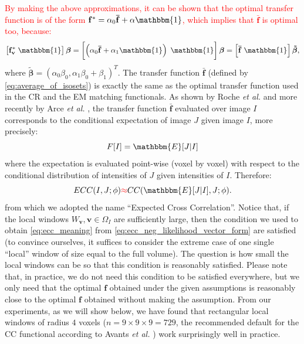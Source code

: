 \textcolor{red}{By making the above approximations, it can be shown that the optimal transfer function is of the form $\mathbf{f^{*}} = \alpha_{0} \mathbf{\bar{f}} + \alpha\mathbbm{1}$, which implies that $\mathbf{\bar{f}}$ is optimal too, because:
\begin{displaymath}
    \left[\mathbf{f^{*}_{v}} \; \mathbbm{1}\right]\boldsymbol{\beta} = 
    \left[\left(\alpha_{0} \mathbf{\bar{f}} + \alpha_{1}\mathbbm{1}\right) \; \mathbbm{1}\right]\boldsymbol{\beta} =
    \left[\mathbf{\bar{f}} \; \mathbbm{1}\right]\boldsymbol{\tilde{\beta}},
\end{displaymath}
}
where $\boldsymbol{\tilde{\beta}} = (\alpha_{0}\beta_{0}, \alpha_{1}\beta_{0} + \beta_{1})^{T}$. The transfer function $\mathbf{\bar{f}}$ (defined by \eqref{eq:average_of_isosets}) is exactly the same as the optimal transfer function used in the CR and the EM matching functionals. As shown by Roche {\it et al.} \cite{Roche1998, Roche2000} and more recently by Arce {\it et al.} \cite{Arce-santana2014}, the transfer function $\mathbf{\bar{f}}$ evaluated over image $I$ corresponds to the conditional expectation of image $J$ given image $I$, more precisely:
\begin{equation*}
    F[I] = \mathbbm{E}[J | I]
\end{equation*}
where the expectation is evaluated point-wise (voxel by voxel) with respect to the conditional distribution of intensities of $J$ given intensities of $I$. Therefore:
\begin{equation}\label{eq:ecc_meaning}
    ECC(I, J; \phi) \textcolor{red}{\approx} CC(\mathbbm{E}[J|I], J ; \phi).
\end{equation}
from which we adopted the name ``Expected Cross Correlation''. Notice that, if the local windows $W_{\mathbf{v}}, \mathbf{v}\in\Omega_{I}$ are sufficiently large, then the condition we used to obtain \eqref{eq:ecc_meaning} from \eqref{eq:ecc_neg_likelihood_vector_form} are satisfied (to convince ourselves, it suffices to consider the extreme case of one single ``local'' window of size equal to the full volume). The question is how small the local windows can be so that this condition is reasonably satisfied. Please note that, in practice, we do not need this condition to be satisfied everywhere, but we only need that the optimal $\mathbf{f}$ obtained under the given assumptions is reasonably close to the optimal $\mathbf{f}$ obtained without making the assumption. From our experiments, as we will show below, we have found that rectangular local windows of radius $4$ voxels ($n=9\times 9\times 9 = 729$, the recommended default for the CC functional according to Avants {\it et al.} \cite{Avants2011}) work surprisingly well in practice.\\

